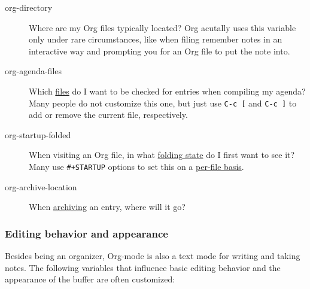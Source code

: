\documentclass[11pt]{article}
\begin{document}
\begin{description}
\item[{org-directory}] Where are my Org files typically located?  Org
acutally uses this variable only under rare circumstances, like
when filing remember notes in an interactive way and prompting
you for an Org file to put the note into.
\end{description}


\begin{description}
\item[{org-agenda-files}] Which \href{http://orgmode.org/manual/Agenda-files.html\#Agenda-files}{files} do I want to be checked for entries
when compiling my agenda?  Many people do not customize this one,
but just use \texttt{C-c [} and \texttt{C-c ]} to add or remove the current
file, respectively.

\item[{org-startup-folded}] When visiting an Org file, in what \href{http://orgmode.org/manual/Visibility-cycling.html\#Visibility-cycling}{folding
state} do I first want to see it?  Many use \texttt{\#+STARTUP} options to
set this on a \href{http://orgmode.org/manual/In\_002dbuffer-settings.html\#In\_002dbuffer-settings}{per-file basis}.

\item[{org-archive-location}] When \href{http://orgmode.org/manual/Archiving.html\#Archiving}{archiving} an entry, where will it go?
\end{description}

\subsubsection*{Editing behavior and appearance}
\label{sec:org4bf9d0e}


Besides being an organizer, Org-mode is also a text mode for writing
and taking notes.  The following variables that influence basic
editing behavior and the appearance of the buffer are often
customized:
\end{document}
